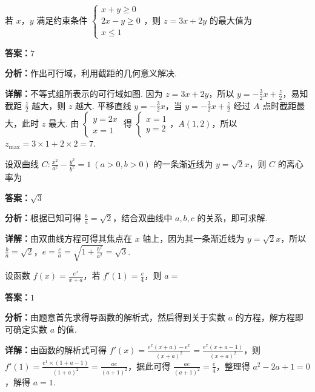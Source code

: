\begin{question}[points=5]
若 $x$，$y$ 满足约束条件 $\begin{cases} x+y\geq0 \\ 2x-y\geq0 \\ x\leq1 \end{cases}$，则 $z=3x+2y$ 的最大值为
\fillin[{$7$}]
\begin{solution}
\textbf{答案：}$7$

\textbf{分析：}作出可行域，利用截距的几何意义解决.

\textbf{详解：}不等式组所表示的可行域如图. 因为 $z=3x+2y$，所以 $y=-\frac{3}{2}x+\frac{z}{2}$，易知截距 $\frac{z}{2}$ 越大，则 $z$ 越大. 平移直线 $y=-\frac{3}{2}x$，当 $y=-\frac{3}{2}x+\frac{z}{2}$ 经过 $A$ 点时截距最大，此时 $z$ 最大. 由 $\begin{cases} y=2x \\ x=1 \end{cases}$ 得 $\begin{cases} x=1 \\ y=2 \end{cases}$，$A(1,2)$，所以 $z_{\max}=3\times1+2\times2=7$.
\end{solution}
\end{question}

\begin{question}[points=5]
设双曲线 $C:\frac{x^2}{a^2}-\frac{y^2}{b^2}=1\ (a>0,b>0)$ 的一条渐近线为 $y=\sqrt{2}x$，则 $C$ 的离心率为
\fillin[{$\sqrt{3}$}]
\begin{solution}
\textbf{答案：}$\sqrt{3}$

\textbf{分析：}根据已知可得 $\frac{b}{a}=\sqrt{2}$，结合双曲线中 $a,b,c$ 的关系，即可求解.

\textbf{详解：}由双曲线方程可得其焦点在 $x$ 轴上，因为其一条渐近线为 $y=\sqrt{2}x$，所以 $\frac{b}{a}=\sqrt{2}$，$e=\frac{c}{a}=\sqrt{1+\frac{b^2}{a^2}}=\sqrt{3}$.
\end{solution}
\end{question}

\begin{question}[points=5]
设函数 $f(x)=\frac{e^x}{x+a}$，若 $f'(1)=\frac{e}{4}$，则 $a=$
\fillin[{$1$}]
\begin{solution}
\textbf{答案：}$1$

\textbf{分析：}由题意首先求得导函数的解析式，然后得到关于实数 $a$ 的方程，解方程即可确定实数 $a$ 的值.

\textbf{详解：}由函数的解析式可得 $f'(x)=\frac{e^x(x+a)-e^x}{(x+a)^2}=\frac{e^x(x+a-1)}{(x+a)^2}$，则 $f'(1)=\frac{e^1\times(1+a-1)}{(1+a)^2}=\frac{ae}{(a+1)^2}$，据此可得 $\frac{ae}{(a+1)^2}=\frac{e}{4}$，整理得 $a^2-2a+1=0$，解得 $a=1$.
\end{solution}
\end{question}

